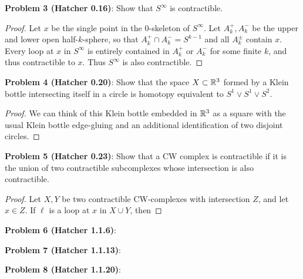 \documentclass{amsart}
\begin{document}
\newpage 


\noindent \textbf{Problem 3 (Hatcher 0.16)}: Show that $S^{\infty}$ is contractible.
\begin{proof}
	Let $x$ be the single point in the $0$-skeleton of $S^{\infty}$. Let $A_k^+,A_k^-$ be the upper and lower open half-$k$-sphere, so that $A_k^+\cap A_k^-=S^{k-1}$ and all $A_k^{\pm}$ contain $x$. Every loop at $x$ in $S^{\infty}$ is entirely contained in $A_k^+$ or $A_k^-$ for some finite $k$, and thus contractible to $x$. Thus $S^{\infty}$ is also contractible.
\end{proof}
\newpage 


\noindent \textbf{Problem 4 (Hatcher 0.20)}: Show that the space $X\subset \mathbb{R}^3$ formed by a Klein bottle intersecting itself in a circle is homotopy equivalent to $S^1\vee S^1 \vee S^2$.
\begin{proof}
	We can think of this Klein bottle embedded in $\mathbb{R}^3$ as a square with the usual Klein bottle edge-gluing and an additional identification of two disjoint circles.
\end{proof}
\newpage 


\noindent \textbf{Problem 5 (Hatcher 0.23)}: Show that a CW complex is contractible if it is the union of two contractible subcomplexes whose intersection is also contractible.

\begin{proof}
	Let $X,Y$ be two contractible CW-complexes with intersection $Z$, and let $x\in Z$. If $\ell$ is a loop at $x$ in $X\cup Y$, then 
\end{proof}

\newpage 


\noindent \textbf{Problem 6 (Hatcher 1.1.6)}: 

\newpage 


\noindent \textbf{Problem 7 (Hatcher 1.1.13)}:

\newpage 


\noindent \textbf{Problem 8 (Hatcher 1.1.20)}:
\end{document}
